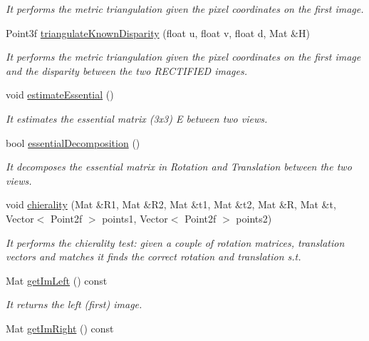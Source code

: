 \begin{DoxyCompactItemize}
\begin{DoxyCompactList}\small\item\em It performs the metric triangulation given the pixel coordinates on the first image. \end{DoxyCompactList}\item 
Point3f \hyperlink{classStereoCamera_a761ea623c4cde38b4fa1d798ef09b7ae}{triangulate\+Known\+Disparity} (float u, float v, float d, Mat \&H)
\begin{DoxyCompactList}\small\item\em It performs the metric triangulation given the pixel coordinates on the first image and the disparity between the two R\+E\+C\+T\+I\+F\+I\+E\+D images. \end{DoxyCompactList}\item 
void \hyperlink{classStereoCamera_ab2eded08bca185ac22cd6343cb4c85c8}{estimate\+Essential} ()
\begin{DoxyCompactList}\small\item\em It estimates the essential matrix (3x3) E between two views. \end{DoxyCompactList}\item 
bool \hyperlink{classStereoCamera_a180388e93b654802c7c56c18d206214b}{essential\+Decomposition} ()
\begin{DoxyCompactList}\small\item\em It decomposes the essential matrix in Rotation and Translation between the two views. \end{DoxyCompactList}\item 
void \hyperlink{classStereoCamera_a245346dbef63e13807c5cd9160803d25}{chierality} (Mat \&R1, Mat \&R2, Mat \&t1, Mat \&t2, Mat \&R, Mat \&t, Vector$<$ Point2f $>$ points1, Vector$<$ Point2f $>$ points2)
\begin{DoxyCompactList}\small\item\em It performs the chierality test\+: given a couple of rotation matrices, translation vectors and matches it finds the correct rotation and translation s.\+t. \end{DoxyCompactList}\item 
Mat \hyperlink{classStereoCamera_a1ed40435ff66e171885c8b2be6987ef7}{get\+Im\+Left} () const 
\begin{DoxyCompactList}\small\item\em It returns the left (first) image. \end{DoxyCompactList}\item 
Mat \hyperlink{classStereoCamera_ade2fcf87e8afab6cf836b979fd048110}{get\+Im\+Right} () const 

\end{DoxyCompactItemize}
